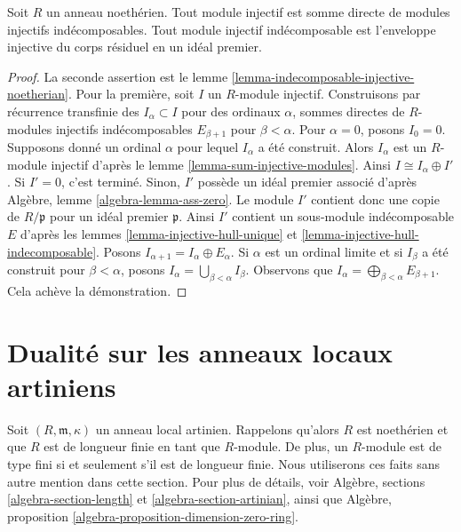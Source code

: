 \begin{proposition}
\label{proposition-structure-injectives-noetherian}
Soit $R$ un anneau noethérien.
Tout module injectif est somme directe de modules injectifs indécomposables.
Tout module injectif indécomposable est l'enveloppe injective
du corps résiduel en un idéal premier.
\end{proposition}

\begin{proof}
La seconde assertion est le lemme \ref{lemma-indecomposable-injective-noetherian}.
Pour la première, soit $I$ un $R$-module injectif.
Construisons par récurrence transfinie des $I_\alpha \subset I$
pour des ordinaux $\alpha$, sommes directes de $R$-modules injectifs
indécomposables $E_{\beta + 1}$ pour $\beta < \alpha$.
Pour $\alpha = 0$, posons $I_0 = 0$. Supposons donné un ordinal $\alpha$
pour lequel $I_\alpha$ a été construit. Alors $I_\alpha$ est un
$R$-module injectif d'après le lemme \ref{lemma-sum-injective-modules}.
Ainsi $I \cong I_\alpha \oplus I'$. Si $I' = 0$, c'est terminé.
Sinon, $I'$ possède un idéal premier associé d'après
Algèbre, lemme \ref{algebra-lemma-ass-zero}.
Le module $I'$ contient donc une copie de $R/\mathfrak p$ pour un idéal premier $\mathfrak p$.
Ainsi $I'$ contient un sous-module indécomposable $E$ d'après
les lemmes \ref{lemma-injective-hull-unique} et \ref{lemma-injective-hull-indecomposable}. Posons $I_{\alpha + 1} = I_\alpha \oplus E_\alpha$.
Si $\alpha$ est un ordinal limite et si $I_\beta$ a été construit
pour $\beta < \alpha$, posons $I_\alpha = \bigcup_{\beta < \alpha} I_\beta$.
Observons que $I_\alpha = \bigoplus_{\beta < \alpha} E_{\beta + 1}$.
Cela achève la démonstration.
\end{proof}



\section{Dualité sur les anneaux locaux artiniens}
\label{section-artinian}

\noindent
Soit $(R, \mathfrak m, \kappa)$ un anneau local artinien.
Rappelons qu'alors $R$ est noethérien et que $R$ est de longueur finie
en tant que $R$-module. De plus, un $R$-module est de type fini
si et seulement s'il est de longueur finie. Nous utiliserons ces faits
sans autre mention dans cette section. Pour plus de détails, voir
Algèbre, sections \ref{algebra-section-length} et \ref{algebra-section-artinian},
ainsi que Algèbre, proposition \ref{algebra-proposition-dimension-zero-ring}.

